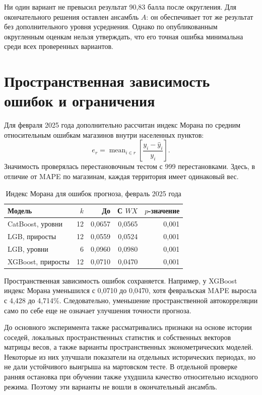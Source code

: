 \documentclass[12pt, a4paper]{article}
\newcommand{\tablesource}[1]{\par\vspace{1mm}{\footnotesize Источник: #1.}}
\begin{document}
Ни один вариант не превысил результат 90,83 балла после округления. Для окончательного решения оставлен ансамбль $A$:
он обеспечивает тот же результат без дополнительного уровня усреднения.
Однако по опубликованным округленным оценкам нельзя утверждать, что его точная ошибка минимальна среди всех проверенных вариантов.

\clearpage

\section*{Пространственная зависимость ошибок и ограничения}

Для февраля 2025 года дополнительно рассчитан индекс Морана \cite{moran1950} по средним относительным ошибкам магазинов внутри населенных пунктов:
\begin{equation}
e_r=\operatorname{mean}_{i\in r}\left[\frac{y_i-\widehat y_i}{y_i}\right].
\end{equation}
Значимость проверялась перестановочным тестом с 999 перестановками. Здесь, в отличие от MAPE по магазинам, каждая территория имеет одинаковый вес.

\begin{table}[H]
\centering
\footnotesize
\caption{Индекс Морана для ошибок прогноза, февраль 2025 года}
\begin{tabularx}{\textwidth}{Xrrrr}\toprule
Модель & $k$ & До & С $WX$ & $p$-значение\\\midrule
CatBoost, уровни & 12 & 0,0657 & 0,0565 & 0,001 \\
LGB, приросты & 12 & 0,0559 & 0,0524 & 0,001 \\
LGB, уровни & 6 & 0,0960 & 0,0980 & 0,001 \\
XGBoost, приросты & 12 & 0,0710 & 0,0470 & 0,001 \\
\bottomrule\end{tabularx}
\tablesource{расчеты авторов по данным X5 Group и GeoNames}
\end{table}

Пространственная зависимость ошибок сохраняется. Например, у XGBoost индекс Морана уменьшился с 0,0710 до 0,0470,
хотя февральская MAPE выросла с 4,428 до 4,714\%. Следовательно, уменьшение пространственной автокорреляции само по себе
еще не означает улучшения точности прогноза.

До основного эксперимента также рассматривались признаки на основе истории соседей, локальных пространственных статистик
и собственных векторов матрицы весов, а также варианты пространственных эконометрических моделей.
Некоторые из них улучшали показатели на отдельных исторических периодах, но не дали устойчивого выигрыша на мартовском тесте.
В отдельной проверке ранняя остановка при обучении также ухудшила качество относительно исходного режима.
Поэтому эти варианты не вошли в окончательный ансамбль.
\end{document}
